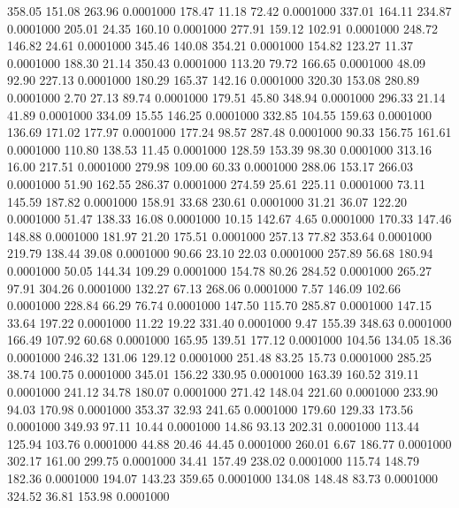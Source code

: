  358.05  151.08  263.96   0.0001000
 178.47   11.18   72.42   0.0001000
 337.01  164.11  234.87   0.0001000
 205.01   24.35  160.10   0.0001000
 277.91  159.12  102.91   0.0001000
 248.72  146.82   24.61   0.0001000
 345.46  140.08  354.21   0.0001000
 154.82  123.27   11.37   0.0001000
 188.30   21.14  350.43   0.0001000
 113.20   79.72  166.65   0.0001000
  48.09   92.90  227.13   0.0001000
 180.29  165.37  142.16   0.0001000
 320.30  153.08  280.89   0.0001000
   2.70   27.13   89.74   0.0001000
 179.51   45.80  348.94   0.0001000
 296.33   21.14   41.89   0.0001000
 334.09   15.55  146.25   0.0001000
 332.85  104.55  159.63   0.0001000
 136.69  171.02  177.97   0.0001000
 177.24   98.57  287.48   0.0001000
  90.33  156.75  161.61   0.0001000
 110.80  138.53   11.45   0.0001000
 128.59  153.39   98.30   0.0001000
 313.16   16.00  217.51   0.0001000
 279.98  109.00   60.33   0.0001000
 288.06  153.17  266.03   0.0001000
  51.90  162.55  286.37   0.0001000
 274.59   25.61  225.11   0.0001000
  73.11  145.59  187.82   0.0001000
 158.91   33.68  230.61   0.0001000
  31.21   36.07  122.20   0.0001000
  51.47  138.33   16.08   0.0001000
  10.15  142.67    4.65   0.0001000
 170.33  147.46  148.88   0.0001000
 181.97   21.20  175.51   0.0001000
 257.13   77.82  353.64   0.0001000
 219.79  138.44   39.08   0.0001000
  90.66   23.10   22.03   0.0001000
 257.89   56.68  180.94   0.0001000
  50.05  144.34  109.29   0.0001000
 154.78   80.26  284.52   0.0001000
 265.27   97.91  304.26   0.0001000
 132.27   67.13  268.06   0.0001000
   7.57  146.09  102.66   0.0001000
 228.84   66.29   76.74   0.0001000
 147.50  115.70  285.87   0.0001000
 147.15   33.64  197.22   0.0001000
  11.22   19.22  331.40   0.0001000
   9.47  155.39  348.63   0.0001000
 166.49  107.92   60.68   0.0001000
 165.95  139.51  177.12   0.0001000
 104.56  134.05   18.36   0.0001000
 246.32  131.06  129.12   0.0001000
 251.48   83.25   15.73   0.0001000
 285.25   38.74  100.75   0.0001000
 345.01  156.22  330.95   0.0001000
 163.39  160.52  319.11   0.0001000
 241.12   34.78  180.07   0.0001000
 271.42  148.04  221.60   0.0001000
 233.90   94.03  170.98   0.0001000
 353.37   32.93  241.65   0.0001000
 179.60  129.33  173.56   0.0001000
 349.93   97.11   10.44   0.0001000
  14.86   93.13  202.31   0.0001000
 113.44  125.94  103.76   0.0001000
  44.88   20.46   44.45   0.0001000
 260.01    6.67  186.77   0.0001000
 302.17  161.00  299.75   0.0001000
  34.41  157.49  238.02   0.0001000
 115.74  148.79  182.36   0.0001000
 194.07  143.23  359.65   0.0001000
 134.08  148.48   83.73   0.0001000
 324.52   36.81  153.98   0.0001000
